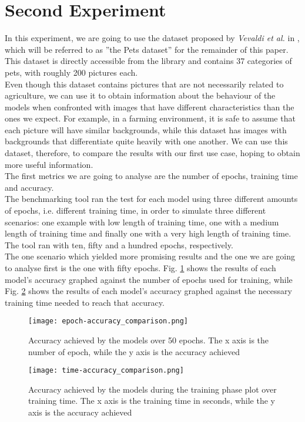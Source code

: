 \section{Second Experiment}
In this experiment, we are going to use the dataset proposed by \textit{Vevaldi et al.} in \cite{parkhi12a}, which will be referred to as ''the Pets dataset'' for the remainder of this paper. This dataset is directly accessible from the library and contains 37 categories of pets, with roughly 200 pictures each. \\
Even though this dataset contains pictures that are not necessarily related to agriculture, we can use it to obtain information about the behaviour of the models when confronted with images that have different characteristics than the ones we expect. For example, in a farming environment, it is safe to assume that each picture will have similar backgrounds, while this dataset has images with backgrounds that differentiate quite heavily with one another. We can use this dataset, therefore, to compare the results with our first use case, hoping to obtain more useful information.\\
The first metrics we are going to analyse are the number of epochs, training time and accuracy.\\
The benchmarking tool ran the test for each model using three different amounts of epochs, i.e. different training time, in order to simulate three different scenarios: one example with low length of training time, one with a medium length of training time and finally one with a very high length of training time. The tool ran with ten, fifty and a hundred epochs, respectively. \\
The one scenario which yielded more promising results and the one we are going to analyse first is the one with fifty epochs. Fig. \ref{fig:com_ep_ac_models} shows the results of each model's accuracy graphed against the number of epochs used for training, while  Fig. \ref{fig:com_ti_ac_models} shows the results of each model's accuracy graphed against the necessary training time needed to reach that accuracy.\\



\begin{figure}[h]
       \centering 
	    \texttt{[image: epoch-accuracy\_comparison.png]}
        \caption[Accuracy achieved by the models over 50 epochs]{Accuracy achieved by the models over 50 epochs. The x axis is the number of epoch, while the y axis is the accuracy achieved}
         \label{fig:com_ep_ac_models}
     \end{figure}
\begin{figure}[h]
\centering 
	    \texttt{[image: time-accuracy\_comparison.png]}
        \caption[Accuracy achieved by the models during the training phase plot over training time]{Accuracy achieved by the models during the training phase plot over training time. The x axis is the training time in seconds, while the y axis is the accuracy achieved}
        \label{fig:com_ti_ac_models}
\end{figure}




